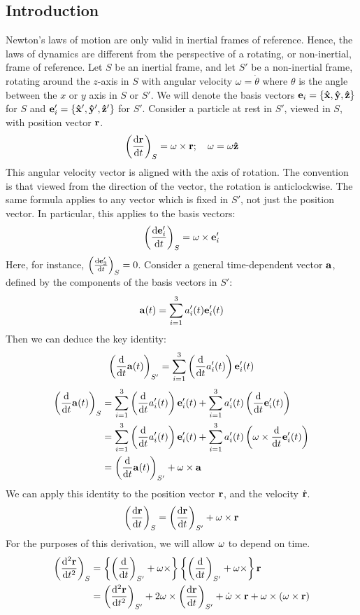 \subsection{Introduction}
Newton's laws of motion are only valid in inertial frames of reference.
Hence, the laws of dynamics are different from the perspective of a rotating, or non-inertial, frame of reference.
Let \(S\) be an inertial frame, and let \(S'\) be a non-inertial frame, rotating around the \(z\)-axis in \(S\) with angular velocity \(\omega = \dot\theta\) where \(\theta\) is the angle between the \(x\) or \(y\) axis in \(S\) or \(S'\).
We will denote the basis vectors \(\vb e_i = \{ \vu{x}, \vu{y}, \vu{z} \}\) for \(S\) and \(\vb e'_i = \{ \vu{x}', \vu{y}', \vu{z}' \}\) for \(S'\).
Consider a particle at rest in \(S'\), viewed in \(S\), with position vector \(\vb r\).
\[
	\left( \dv{\vb r}{t} \right)_S = \vb\omega \times \vb r;\quad \vb\omega = \omega\vu{z}
\]
This angular velocity vector is aligned with the axis of rotation.
The convention is that viewed from the direction of the vector, the rotation is anticlockwise.
The same formula applies to any vector which is fixed in \(S'\), not just the position vector.
In particular, this applies to the basis vectors:
\[
	\left( \dv{\vb e_i'}{t} \right)_S = \vb\omega \times \vb e_i'
\]
Here, for instance, \(\left( \dv{\vb e_3'}{t} \right)_S = 0\).
Consider a general time-dependent vector \(\vb a\), defined by the components of the basis vectors in \(S'\):
\[
	\vb a(t) = \sum_{i=1}^3 a_i'(t)\vb e'_i(t)
\]
Then we can deduce the key identity:
\[
	\left( \dv{t} \vb a(t) \right)_{S'} = \sum_{i=1}^3\left( \dv{t} a_i'(t)  \right) \vb e'_i(t)
\]
\begin{align*}
	\left( \dv{t} \vb a(t) \right)_{S} & = \sum_{i=1}^3\left( \dv{t} a_i'(t) \right) \vb e'_i(t) + \sum_{i=1}^3 a'_i(t) \left( \dv{t} \vb e_i'(t) \right)                   \\
	                                   & = \sum_{i=1}^3\left( \dv{t} a_i'(t) \right) \vb e'_i(t) + \sum_{i=1}^3 a'_i(t) \left( \vb\omega \times \dv{t} \vb  e_i'(t) \right) \\
	                                   & = \left( \dv{t} \vb a(t) \right)_{S'} + \vb\omega \times \vb a
\end{align*}
We can apply this identity to the position vector \(\vb r\), and the velocity \(\dot{\vb{r}}\).
\[
	\left( \dv{\vb r}{t} \right)_S = \left( \dv{\vb r}{t} \right)_{S'} + \vb\omega \times \vb r
\]
For the purposes of this derivation, we will allow \(\vb\omega\) to depend on time.
\begin{align*}
	\left( \dv[2]{\vb r}{t} \right)_S & = \left\{ \left( \dv{t} \right)_{S'} + \vb\omega \times \right\} \left\{ \left( \dv{t} \right)_{S'} + \vb\omega \times \right\} \vb r                                     \\
	                                  & = \left( \dv[2]{\vb r}{t} \right)_{S'} + 2 \vb\omega \times \left( \dv{\vb r}{t} \right)_{S'} + \dot{\vb\omega} \times \vb r + \vb\omega \times (\vb \omega \times \vb r)
\end{align*}
